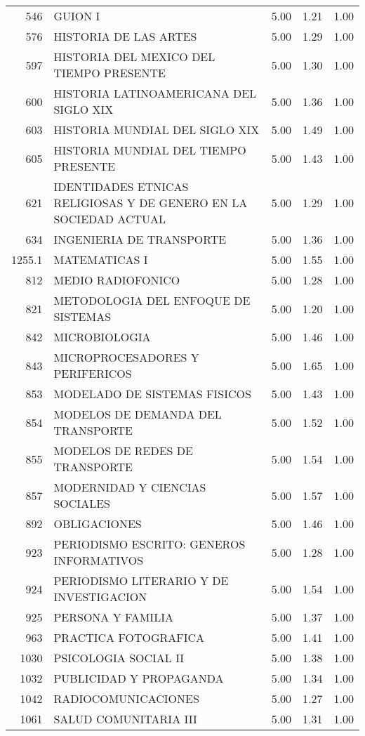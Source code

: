 \documentclass[12pt]{article}
\begin{document}
\begin{table}[ht]
\begin{tabular}{rlrrr}
  546 & GUION I & 5.00 & 1.21 & 1.00 \\ 
  576 & HISTORIA DE LAS ARTES & 5.00 & 1.29 & 1.00 \\ 
  597 & HISTORIA DEL MEXICO DEL TIEMPO PRESENTE & 5.00 & 1.30 & 1.00 \\ 
  600 & HISTORIA LATINOAMERICANA DEL SIGLO XIX & 5.00 & 1.36 & 1.00 \\ 
  603 & HISTORIA MUNDIAL DEL SIGLO XIX & 5.00 & 1.49 & 1.00 \\ 
  605 & HISTORIA MUNDIAL DEL TIEMPO PRESENTE & 5.00 & 1.43 & 1.00 \\ 
  621 & IDENTIDADES ETNICAS RELIGIOSAS Y DE GENERO EN LA SOCIEDAD ACTUAL & 5.00 & 1.29 & 1.00 \\ 
  634 & INGENIERIA DE TRANSPORTE & 5.00 & 1.36 & 1.00 \\ 
  1255.1 & MATEMATICAS I & 5.00 & 1.55 & 1.00 \\ 
  812 & MEDIO RADIOFONICO & 5.00 & 1.28 & 1.00 \\ 
  821 & METODOLOGIA DEL ENFOQUE DE SISTEMAS & 5.00 & 1.20 & 1.00 \\ 
  842 & MICROBIOLOGIA & 5.00 & 1.46 & 1.00 \\ 
  843 & MICROPROCESADORES Y PERIFERICOS & 5.00 & 1.65 & 1.00 \\ 
  853 & MODELADO DE SISTEMAS FISICOS & 5.00 & 1.43 & 1.00 \\ 
  854 & MODELOS DE DEMANDA DEL TRANSPORTE & 5.00 & 1.52 & 1.00 \\ 
  855 & MODELOS DE REDES DE TRANSPORTE & 5.00 & 1.54 & 1.00 \\ 
  857 & MODERNIDAD Y CIENCIAS SOCIALES & 5.00 & 1.57 & 1.00 \\ 
  892 & OBLIGACIONES & 5.00 & 1.46 & 1.00 \\ 
  923 & PERIODISMO ESCRITO: GENEROS INFORMATIVOS & 5.00 & 1.28 & 1.00 \\ 
  924 & PERIODISMO LITERARIO Y DE INVESTIGACION & 5.00 & 1.54 & 1.00 \\ 
  925 & PERSONA Y FAMILIA & 5.00 & 1.37 & 1.00 \\ 
  963 & PRACTICA FOTOGRAFICA & 5.00 & 1.41 & 1.00 \\ 
  1030 & PSICOLOGIA SOCIAL II & 5.00 & 1.38 & 1.00 \\ 
  1032 & PUBLICIDAD Y PROPAGANDA & 5.00 & 1.34 & 1.00 \\ 
  1042 & RADIOCOMUNICACIONES & 5.00 & 1.27 & 1.00 \\ 
  1061 & SALUD COMUNITARIA III & 5.00 & 1.31 & 1.00 \\ 

\end{tabular}
\end{table}
\end{document}

